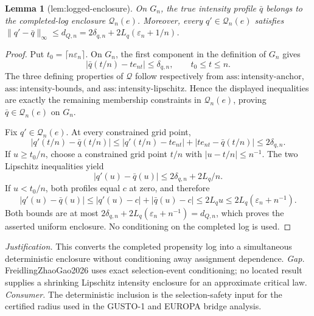 \documentclass{article}
\newtheorem{lemma}{Lemma}
\begin{document}
\begin{lemma}[lem:logged-enclosure]\label{lem:logged-enclosure}
On \(G_n\), the true intensity profile \(\bar q\) belongs to the completed-log enclosure \(\mathcal Q_n(e)\). Moreover, every \(q'\in\mathcal Q_n(e)\) satisfies \(\|q'-\bar q\|_{\infty}\le d_{Q,n}=2\delta_{q,n}+2L_q(\varepsilon_n+1/n)\).
\end{lemma}
\begin{proof}
Put \(t_0=\lceil n\varepsilon_n\rceil\).  On \(G_n\), the first component in the definition of \(G_n\) gives
\[
 \left|\bar q(t/n)-t e_{nt}\right|\leq\delta_{q,n},
 \qquad t_0\leq t\leq n.
\]
The three defining properties of \(\mathcal Q\) follow respectively from
\(\mathrm{ass:intensity\mbox{-}anchor}\),
\(\mathrm{ass:intensity\mbox{-}bounds}\), and
\(\mathrm{ass:intensity\mbox{-}lipschitz}\).  Hence the displayed inequalities are exactly the remaining membership constraints in \(\mathcal Q_n(e)\), proving
\(\bar q\in\mathcal Q_n(e)\) on \(G_n\).

Fix \(q'\in\mathcal Q_n(e)\).  At every constrained grid point,
\[
 |q'(t/n)-\bar q(t/n)|
 \leq |q'(t/n)-t e_{nt}|+|t e_{nt}-\bar q(t/n)|
 \leq 2\delta_{q,n}.
\]
If \(u\geq t_0/n\), choose a constrained grid point \(t/n\) with
\(|u-t/n|\leq n^{-1}\).  The two Lipschitz inequalities yield
\[
 |q'(u)-\bar q(u)|
 \leq 2\delta_{q,n}+2L_q/n.
\]
If \(u<t_0/n\), both profiles equal \(c\) at zero, and therefore
\[
 |q'(u)-\bar q(u)|
 \leq |q'(u)-c|+|\bar q(u)-c|
 \leq 2L_q u
 \leq 2L_q(\varepsilon_n+n^{-1}).
\]
Both bounds are at most
\(2\delta_{q,n}+2L_q(\varepsilon_n+n^{-1})=d_{Q,n}\), which proves the asserted uniform enclosure.  No conditioning on the completed log is used.
\end{proof}
\par\smallskip\noindent \textit{Justification.} This converts the completed propensity log into a simultaneous deterministic enclosure without conditioning away assignment dependence. \textit{Gap.} FreidlingZhaoGao2026 uses exact selection-event conditioning; no located result supplies a shrinking Lipschitz intensity enclosure for an approximate critical law. \textit{Consumer.} The deterministic inclusion is the selection-safety input for the certified radius used in the GUSTO-1 and EUROPA bridge analysis.
\end{document}

